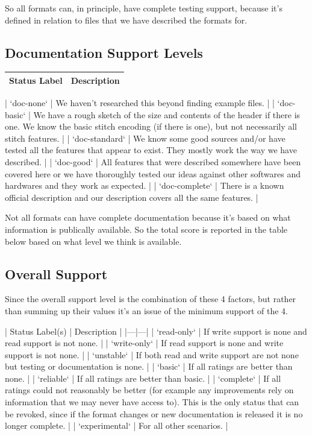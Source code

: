 \documentclass{report}
\begin{document}
So all formats can, in principle, have complete testing support, because it's defined in relation to files that we have described the formats for.

\subsection{Documentation Support Levels}

\begin{tabular}{l l}
Status Label & Description \\
\hline
\end{tabular}

| `doc-none` | We haven't researched this beyond finding example files. |
| `doc-basic` | We have a rough sketch of the size and contents of the header if there is one. We know the basic stitch encoding (if there is one), but not necessarily all stitch features. |
| `doc-standard` | We know some good sources and/or have tested all the features that appear to exist. They mostly work the way we have described. |
| `doc-good` | All features that were described somewhere have been covered here or we have thoroughly tested our ideas against other softwares and hardwares and they work as expected. |
| `doc-complete` | There is a known official description and our description covers all the same features. |

Not all formats can have complete documentation because it's based on what 
information is publically available. So the total score is reported in the table
below based on what level we think is available.

\subsection{Overall Support}

Since the overall support level is the combination of these
4 factors, but rather than summing up their values it's an 
issue of the minimum support of the 4.

| Status Label(s) | Description |
|---|---|
| `read-only` | If write support is none and read support is not none. |
| `write-only` | If read support is none and write support is not none. |
| `unstable` | If both read and write support are not none but testing or documentation is none. |
| `basic` | If all ratings are better than none. |
| `reliable` | If all ratings are better than basic. |
| `complete` | If all ratings could not reasonably be better (for example any improvements rely on information that we may never have access to). This is the only status that can be revoked, since if the format changes or new documentation is released it is no longer complete. |
| `experimental` | For all other scenarios. |
\end{document}
